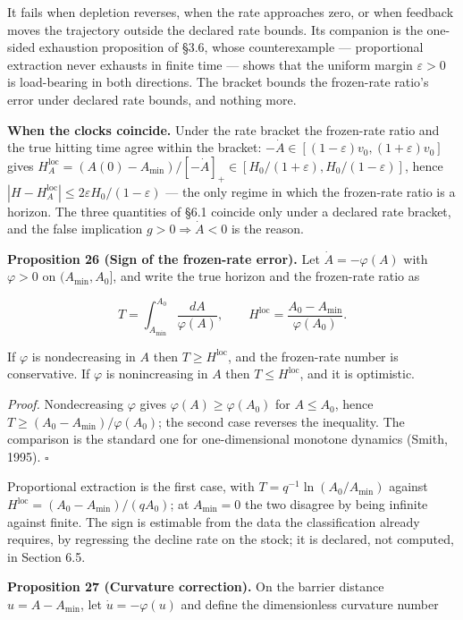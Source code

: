 \documentclass[11pt]{article}
\begin{document}
It fails when depletion reverses, when the rate approaches zero, or when feedback moves the trajectory outside the declared rate bounds. Its companion is the one-sided exhaustion proposition of \S3.6, whose counterexample --- proportional extraction never exhausts in finite time --- shows that the uniform margin \(\varepsilon>0\) is load-bearing in both directions. The bracket bounds the frozen-rate ratio's error under declared rate bounds, and nothing more.

\textbf{When the clocks coincide.} Under the rate bracket the frozen-rate ratio and the true hitting time agree within the bracket: \(-\dot A \in [(1-\varepsilon)v_0,\allowbreak{} (1+\allowbreak{}\varepsilon)v_0]\) gives \(H_A^{\mathrm{loc}} =\allowbreak{} (A(0) - A_{\min})/[-\dot A]_+\allowbreak{} \in [H_0/(1+\allowbreak{}\varepsilon),\allowbreak{} H_0/(1-\varepsilon)]\), hence \(|H - H_A^{\mathrm{loc}}| \le 2\varepsilon H_0/(1-\varepsilon)\) --- the only regime in which the frozen-rate ratio is a horizon. The three quantities of \S6.1 coincide only under a declared rate bracket, and the false implication \(g>0\Rightarrow\dot A<0\) is the reason.

\textbf{Proposition 26 (Sign of the frozen-rate error).} Let \(\dot A=-\varphi(A)\) with \(\varphi>0\) on \((A_{\min},A_0]\), and write the true horizon and the frozen-rate ratio as 

$$T=\int_{A_{\min}}^{A_0}\frac{dA}{\varphi(A)}, \qquad H^{\mathrm{loc}}=\frac{A_0-A_{\min}}{\varphi(A_0)} .$$

 If \(\varphi\) is nondecreasing in \(A\) then \(T\ge H^{\mathrm{loc}}\), and the frozen-rate number is conservative. If \(\varphi\) is nonincreasing in \(A\) then \(T\le H^{\mathrm{loc}}\), and it is optimistic.

\emph{Proof.} Nondecreasing \(\varphi\) gives \(\varphi(A)\ge\varphi(A_0)\) for \(A\le A_0\), hence \(T\ge(A_0-A_{\min})/\varphi(A_0)\); the second case reverses the inequality. The comparison is the standard one for one-dimensional monotone dynamics (Smith, 1995). \(\square\)

Proportional extraction is the first case, with \(T=\allowbreak{}q^{-1}\ln(A_0/\allowbreak{}A_{\min})\) against \(H^{\mathrm{loc}}=\allowbreak{}(A_0-A_{\min})/(qA_0)\); at \(A_{\min}=0\) the two disagree by being infinite against finite. The sign is estimable from the data the classification already requires, by regressing the decline rate on the stock; it is declared, not computed, in Section 6.5.

\textbf{Proposition 27 (Curvature correction).} On the barrier distance \(u=A-A_{\min}\), let \(\dot u=-\varphi(u)\) and define the dimensionless curvature number 
\end{document}
